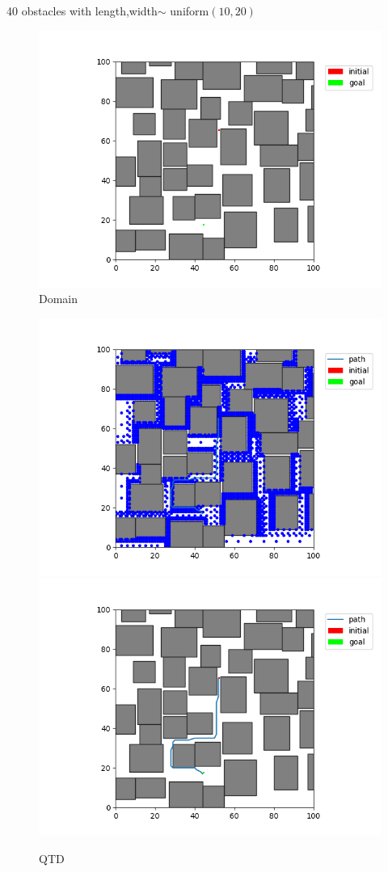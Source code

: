 \documentclass[12pt,a4paper]{article}
\begin{document}
40 obstacles with length,width$\sim$ uniform$(10,20)$\\
\begin{figure}[H]
\centering
	\includegraphics[scale=.40]{40_20_emp}
\caption{Domain}
\end{figure}

\begin{figure}[H]
\centering
	\includegraphics[scale=.40]{40_20_qtd_state}
    \includegraphics[scale=.40]{40_20_qtd_path}
\caption{QTD}
\end{figure}
\end{document}
